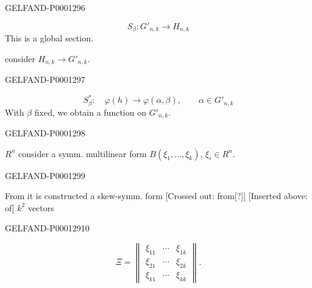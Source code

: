 \begin{GelfandAdjacentEvidence}{GELFAND-P000129}{6}

\begin{equation*}S_\beta: G'_{n, k}\longrightarrow H_{n, k}\end{equation*}
This is a global section.

consider $H_{n, k}\to G'_{n, k}$.
\end{GelfandAdjacentEvidence}
\begin{GelfandAdjacentEvidence}{GELFAND-P000129}{7}

\begin{equation*}S_\beta^*:\quad\varphi (h)\to\varphi (\alpha,\beta),\qquad\alpha\in G'_{n, k}\end{equation*}
With $\beta$ fixed, we obtain a function on $G'_{n, k}$.
\end{GelfandAdjacentEvidence}
\begin{GelfandAdjacentEvidence}{GELFAND-P000129}{8}

$R^n$ consider a symm. multilinear form $B (\xi_1,\ldots,\xi_k)$, $\xi_i\in R^n$.
\end{GelfandAdjacentEvidence}
\begin{GelfandAdjacentEvidence}{GELFAND-P000129}{9}

From it is constructed a skew-symm. form [Crossed out: from[?]] [Inserted above: of] $k^2$ vectors
\end{GelfandAdjacentEvidence}
\begin{GelfandAdjacentEvidence}{GELFAND-P000129}{10}

\begin{equation*}\Xi=\left\|\begin{matrix}
\xi_{11}&\cdots&\xi_{1k}\\
\xi_{21}&\cdots&\xi_{2k}\\[1.2ex]
\xi_{k1}&\cdots&\xi_{kk}
\end{matrix}\right\|.\end{equation*}
\end{GelfandAdjacentEvidence}
